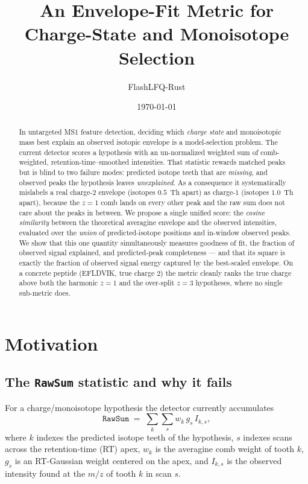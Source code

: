 \documentclass[11pt]{article}
\title{An Envelope-Fit Metric for Charge-State and Monoisotope Selection}
\author{FlashLFQ-Rust}
\date{\today}
\begin{document}
\maketitle

\begin{abstract}
In untargeted MS1 feature detection, deciding which \emph{charge state} and
monoisotopic mass best explain an observed isotopic envelope is a model-selection
problem. The current detector scores a hypothesis with an un-normalized weighted
sum of comb-weighted, retention-time--smoothed intensities. That statistic rewards
matched peaks but is blind to two failure modes: predicted isotope teeth that are
\emph{missing}, and observed peaks the hypothesis leaves \emph{unexplained}. As a
consequence it systematically mislabels a real charge-$2$ envelope (isotopes
$0.5$~Th apart) as charge-$1$ (isotopes $1.0$~Th apart), because the $z{=}1$ comb
lands on every other peak and the raw sum does not care about the peaks in between.
We propose a single unified score: the \emph{cosine similarity} between the
theoretical averagine envelope and the observed intensities, evaluated over the
\emph{union} of predicted-isotope positions and in-window observed peaks. We show
that this one quantity simultaneously measures goodness of fit, the fraction of
observed signal explained, and predicted-peak completeness --- and that its square
is exactly the fraction of observed signal energy captured by the best-scaled
envelope. On a concrete peptide (EFLDVIK, true charge $2$) the metric cleanly ranks
the true charge above both the harmonic $z{=}1$ and the over-split $z{=}3$
hypotheses, where no single sub-metric does.
\end{abstract}

\section{Motivation}
\label{sec:motivation}

\subsection{The \texttt{RawSum} statistic and why it fails}

For a charge/monoisotope hypothesis the detector currently accumulates
\begin{equation}
\texttt{RawSum} \;=\; \sum_{k}\sum_{s} w_k \, g_s \, I_{k,s},
\label{eq:rawsum}
\end{equation}
where $k$ indexes the predicted isotope teeth of the hypothesis, $s$ indexes scans
across the retention-time (RT) apex, $w_k$ is the averagine comb weight of tooth
$k$, $g_s$ is an RT-Gaussian weight centered on the apex, and $I_{k,s}$ is the
observed intensity found at the $m/z$ of tooth $k$ in scan $s$.
\end{document}
